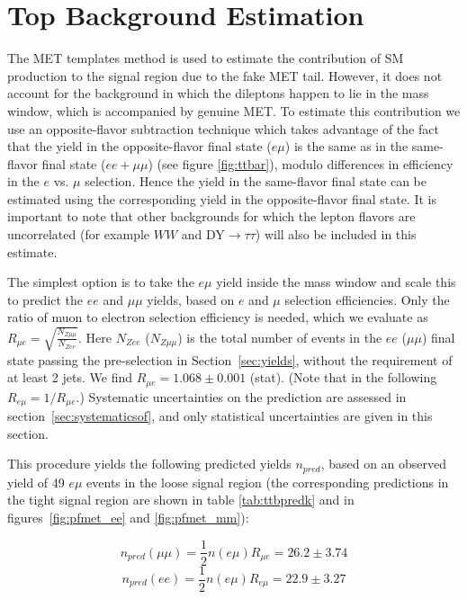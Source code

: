 


\section{Top Background Estimation}
\label{sec:topbkg}


The MET templates method is used to estimate the contribution of SM \Z production
 to the signal region due to the fake MET tail. However,
it does not account for the \ttbar background in which the dileptons happen to lie
 in the \Z mass window, which is accompanied by genuine MET. 
To estimate this contribution we use an opposite-flavor subtraction
technique which takes advantage of the fact that the \ttbar yield in the 
opposite-flavor final state ($e\mu$) is the same as in the same-flavor final state
($ee+\mu\mu$) (see figure \ref{fig:ttbar}), 
modulo differences in efficiency in the $e$ vs. $\mu$ selection.
 Hence the \ttbar yield in the same-flavor final state can be estimated
using the corresponding yield in the opposite-flavor final state. 
It is important to note that other backgrounds for which the lepton flavors are
uncorrelated (for example $WW$ and DY$\rightarrow \tau\tau$) will also be included in
this estimate.

The simplest option
 is to take the $e\mu$ yield inside the \Z mass window and scale this
to predict the $ee$ and $\mu\mu$ yields, based on $e$ and $\mu$ selection efficiencies.
Only the ratio of muon to electron selection efficiency is needed, which we evaluate
 as $R_{\mu e} = \sqrt{\frac{N_{Z\mu\mu}}{N_{Zee}}}$. 
Here $N_{Zee}$ ($N_{Z\mu\mu}$) is the total number of events in the $ee$ ($\mu\mu$)
 final state passing the pre-selection in Section~\ref{sec:yields},
without the requirement of at least 2 jets. We find
 $R_{\mu e}=1.068 \pm 0.001$ (stat). %
(Note that in the following $R_{e\mu} = 1/R_{\mu e}$.)
Systematic uncertainties on the prediction are assessed in section~\ref{sec:systematicsof}, 
and only statistical uncertainties are given in this section.

This procedure yields the following predicted yields $n_{pred}$,
based on an observed yield of 
49 %
$e\mu$ events %
in the loose signal region 
(the corresponding predictions in the tight 
signal region are shown in table \ref{tab:ttbpredk}
and in figures~\ref{fig:pfmet_ee} and \ref{fig:pfmet_mm}): 

\begin{equation}
n_{pred}(\mu\mu) = \frac{1}{2}n(e\mu)R_{\mu e} = 26.2 \pm 3.74 %
\end{equation}
\begin{equation}
n_{pred}(ee)     = \frac{1}{2}n(e\mu)R_{e\mu} = 22.9 \pm 3.27 %
\end{equation}

